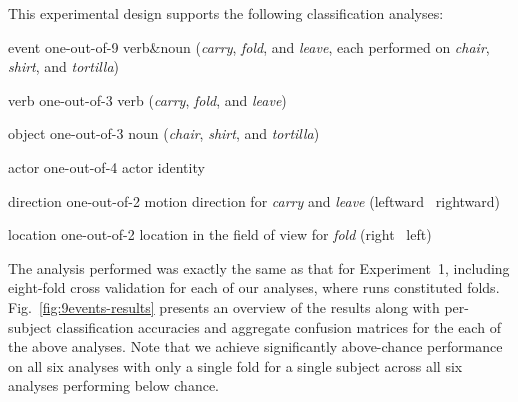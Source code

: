 This experimental design supports the following classification analyses:
%
\begin{compactdesc}
\item[event] one-out-of-9 verb\&noun (\emph{carry}, \emph{fold}, and
  \emph{leave}, each performed on \emph{chair}, \emph{shirt}, and
  \emph{tortilla})
\item[verb] one-out-of-3 verb (\emph{carry}, \emph{fold}, and \emph{leave})
\item[object] one-out-of-3 noun (\emph{chair}, \emph{shirt}, and
  \emph{tortilla})
\item[actor] one-out-of-4 actor identity
\item[direction] one-out-of-2 motion direction for \emph{carry} and \emph{leave}
  (leftward \vs\ rightward)
\item[location] one-out-of-2 location in the field of view for \emph{fold}
  (right \vs\ left)
\end{compactdesc}
%
The analysis performed was exactly the same as that for Experiment~1,
including eight-fold cross validation for each of our analyses, where runs
constituted folds.
%
Fig.~\ref{fig:9events-results} presents an overview of the results along with
per-subject classification accuracies and aggregate confusion matrices for the
each of the above analyses.
%
Note that we achieve significantly above-chance performance on all six analyses
with only a single fold for a single subject across all six analyses
performing below chance.

